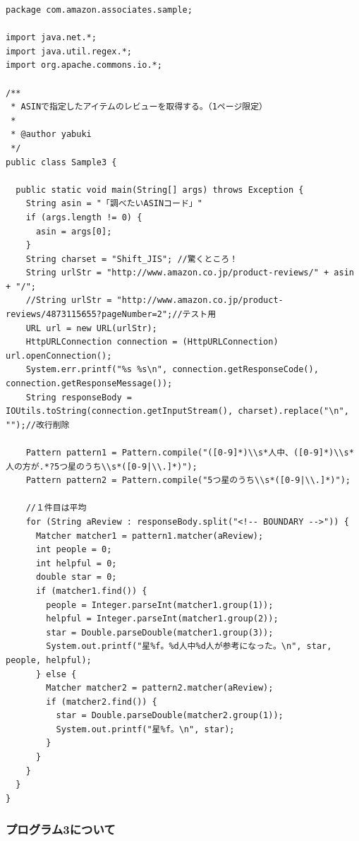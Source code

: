 \begin{lstlisting}
package com.amazon.associates.sample;

import java.net.*;
import java.util.regex.*;
import org.apache.commons.io.*;

/**
 * ASINで指定したアイテムのレビューを取得する。（1ページ限定）
 * 
 * @author yabuki
 */
public class Sample3 {

  public static void main(String[] args) throws Exception {
    String asin = "「調べたいASINコード」"
    if (args.length != 0) {
      asin = args[0];
    }
    String charset = "Shift_JIS"; //驚くところ！
    String urlStr = "http://www.amazon.co.jp/product-reviews/" + asin + "/";
    //String urlStr = "http://www.amazon.co.jp/product-reviews/4873115655?pageNumber=2";//テスト用
    URL url = new URL(urlStr);
    HttpURLConnection connection = (HttpURLConnection) url.openConnection();
    System.err.printf("%s %s\n", connection.getResponseCode(), connection.getResponseMessage());
    String responseBody = IOUtils.toString(connection.getInputStream(), charset).replace("\n", "");//改行削除

    Pattern pattern1 = Pattern.compile("([0-9]*)\\s*人中、([0-9]*)\\s*人の方が.*?5つ星のうち\\s*([0-9|\\.]*)");
    Pattern pattern2 = Pattern.compile("5つ星のうち\\s*([0-9|\\.]*)");

    //１件目は平均
    for (String aReview : responseBody.split("<!-- BOUNDARY -->")) {
      Matcher matcher1 = pattern1.matcher(aReview);
      int people = 0;
      int helpful = 0;
      double star = 0;
      if (matcher1.find()) {
        people = Integer.parseInt(matcher1.group(1));
        helpful = Integer.parseInt(matcher1.group(2));
        star = Double.parseDouble(matcher1.group(3));
        System.out.printf("星%f。%d人中%d人が参考になった。\n", star, people, helpful);
      } else {
        Matcher matcher2 = pattern2.matcher(aReview);
        if (matcher2.find()) {
          star = Double.parseDouble(matcher2.group(1));
          System.out.printf("星%f。\n", star);
        }
      }
    }
  }
}

\end{lstlisting}


\subsubsection{プログラム3について}

